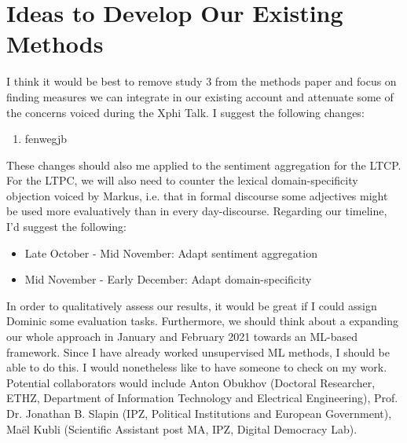 \documentclass{article}
\begin{document}
\citet{Taboada2016}


\section{Ideas to Develop Our Existing Methods}

I think it would be best to remove study 3 from the methods paper and focus on finding measures we can integrate in our existing account and attenuate some of the concerns voiced during the Xphi Talk. I suggest the following changes:

\begin{enumerate}
\item fenwegjb
\end{enumerate}

These changes should also me applied to the sentiment aggregation for the LTCP. For the LTPC, we will also need to counter the lexical domain-specificity objection voiced by Markus, i.e. that in formal discourse some adjectives might be used more evaluatively than in every day-discourse. Regarding our timeline, I'd suggest the following:

\begin{itemize}
\item Late October - Mid November: Adapt sentiment aggregation
\item Mid November - Early December: Adapt domain-specificity
\end{itemize}

In order to qualitatively assess our results, it would be great if I could assign Dominic some evaluation tasks. Furthermore, we should think about a expanding our whole approach in January and February 2021 towards an ML-based framework. Since I have already worked unsupervised ML methods, I should be able to do this. I would nonetheless like to have someone to check on my work. Potential collaborators would include Anton Obukhov (Doctoral Researcher, ETHZ, Department of Information Technology and Electrical Engineering), Prof. Dr. Jonathan B. Slapin (IPZ, Political Institutions and European Government), Maël Kubli (Scientific Assistant post MA, IPZ, Digital Democracy Lab).

\pagebreak



\end{document}
